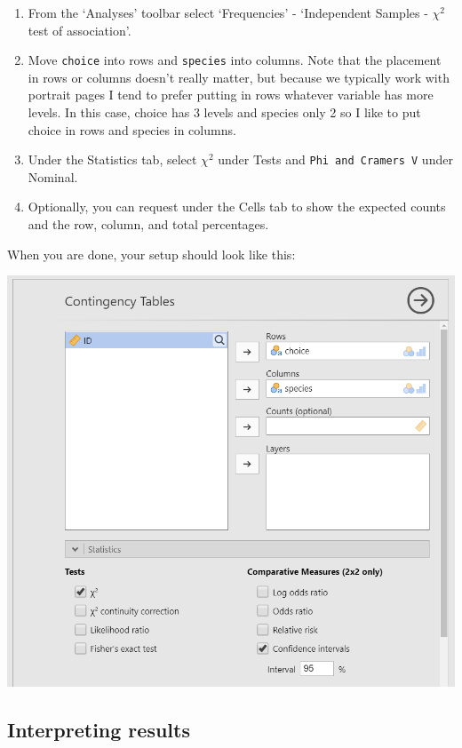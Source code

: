 \documentclass[
]{book}
\begin{document}
\begin{enumerate}
\def\labelenumi{\arabic{enumi}.}
\item
  From the `Analyses' toolbar select `Frequencies' - `Independent Samples - \(\chi^2\) test of association'.
\item
  Move \texttt{choice} into rows and \texttt{species} into columns. Note that the placement in rows or columns doesn't really matter, but because we typically work with portrait pages I tend to prefer putting in rows whatever variable has more levels. In this case, choice has 3 levels and species only 2 so I like to put choice in rows and species in columns.
\item
  Under the Statistics tab, select \(\chi^2\) under Tests and \texttt{Phi\ and\ Cramer\textquotesingle{}s\ V} under Nominal.
\item
  Optionally, you can request under the Cells tab to show the expected counts and the row, column, and total percentages.
\end{enumerate}

When you are done, your setup should look like this:

\includegraphics{images/11-independence/independence_setup.png}

\hypertarget{interpreting-results-1}{%
\subsection{Interpreting results}\label{interpreting-results-1}}
\end{document}

